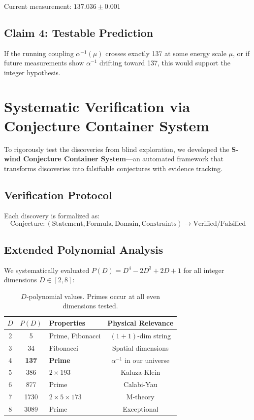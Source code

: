 \documentclass[11pt,a4paper]{article}
\begin{document}
Current measurement: $137.036 \pm 0.001$

\subsection{Claim 4: Testable Prediction}

If the running coupling $\alpha^{-1}(\mu)$ crosses exactly 137 at some energy scale $\mu$, or if future measurements show $\alpha^{-1}$ drifting toward 137, this would support the integer hypothesis.

\section{Systematic Verification via Conjecture Container System}

To rigorously test the discoveries from blind exploration, we developed the \textbf{S-wind Conjecture Container System}---an automated framework that transforms discoveries into falsifiable conjectures with evidence tracking.

\subsection{Verification Protocol}

Each discovery is formalized as:
\begin{equation}
\text{Conjecture}: (\text{Statement}, \text{Formula}, \text{Domain}, \text{Constraints}) \to \text{Verified/Falsified}
\end{equation}

\subsection{Extended Polynomial Analysis}

We systematically evaluated $P(D) = D^4 - 2D^3 + 2D + 1$ for all integer dimensions $D \in [2, 8]$:

\begin{table}[h]
\centering
\begin{tabular}{|c|c|l|c|}
\hline
$D$ & $P(D)$ & Properties & Physical Relevance \\
\hline
2 & 5 & Prime, Fibonacci & $(1+1)$-dim string \\
3 & 34 & Fibonacci & Spatial dimensions \\
4 & \textbf{137} & \textbf{Prime} & $\alpha^{-1}$ in our universe \\
5 & 386 & $2 \times 193$ & Kaluza-Klein \\
6 & 877 & Prime & Calabi-Yau \\
7 & 1730 & $2 \times 5 \times 173$ & M-theory \\
8 & 3089 & Prime & Exceptional \\
\hline
\end{tabular}
\caption{$D$-polynomial values. Primes occur at all even dimensions tested.}
\end{table}
\end{document}
